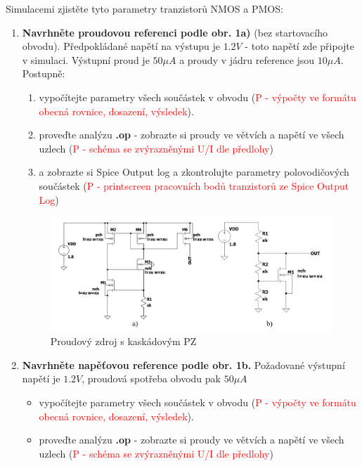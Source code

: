 Simulacemi zjistěte tyto parametry tranzistorů NMOS a PMOS:

\begin{enumerate}
    \item {\bf Navrhněte proudovou referenci podle obr. 1a)} (bez startovacího obvodu). Předpokládané napětí na výstupu je \(1.2 V\) - toto napětí zde připojte v simulaci. Výstupní proud je \(50 \mu A\) 
    a proudy v jádru reference jsou \(10 \mu A\). Postupně:    
    \begin{enumerate}
        \item vypočítejte parametry všech součástek v obvodu (\textcolor{red}{P - výpočty ve formátu obecná rovnice, dosazení, výsledek}).
        \item proveďte analýzu {\bf.op} - zobrazte si proudy ve větvích a napětí ve všech uzlech  (\textcolor{red}{P - schéma se zvýrazněnými U/I dle předlohy})
        \item a zobrazte si Spice Output log a zkontrolujte parametry polovodičových součástek (\textcolor{red}{P - printscreen pracovních bodů tranzistorů ze Spice Output Log})
    \end{enumerate}
    \begin{figure}[h]
        \centering
        \includegraphics[height=0.3\textheight]{text/img/zadani.png}
        \caption{\label{fig:sch_zadani} Proudový zdroj s kaskádovým PZ}
    \end{figure}
    \item {\bf Navrhněte napěťovou reference podle obr. 1b.} Požadované výstupní napětí je \(1.2 V\), proudová spotřeba obvodu pak \(50 \mu A\)
    \begin{itemize}
        \item vypočítejte parametry všech součástek v obvodu  (\textcolor{red}{P - výpočty ve formátu obecná rovnice, dosazení, výsledek}).
        \item proveďte analýzu {\bf.op} - zobrazte si proudy ve větvích a napětí ve všech uzlech  (\textcolor{red}{P - schéma se zvýrazněnými U/I dle předlohy})

\end{itemize}
\end{enumerate}
